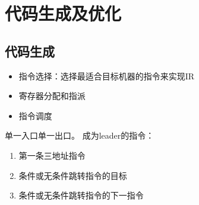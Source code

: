 
\section{代码生成及优化}
\subsection{代码生成}
\begin{itemize}
	\item 指令选择：选择最适合目标机器的指令来实现IR
	\item 寄存器分配和指派
	\item 指令调度
\end{itemize}

\begin{definition}
单一入口单一出口。
成为leader的指令：
\begin{enumerate}
	\item 第一条三地址指令
	\item 条件或无条件跳转指令的目标
	\item 条件或无条件跳转指令的下一指令
\end{enumerate}
\end{definition}

